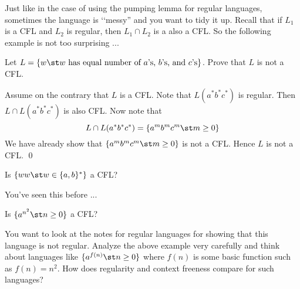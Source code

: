 \newpage
Just like in the case of using the pumping lemma for regular languages, 
sometimes the language is \lq\lq messy'' and you want to tidy it up.
Recall that if $L_1$ is a CFL and $L_2$ is regular,
then $L_1 \cap L_2$ is a also a CFL.
So the following example is not too surprising ...



\begin{eg}
Let $L = \{w \st w \text{ has equal number of $a$'s, $b$'s, and $c$'s} \}$.
Prove that $L$ is not a CFL.
\end{eg}

\SOLUTION
Assume on the contrary that $L$ is a CFL.
Note that $L(a^*b^*c^*)$ is regular.
Then $L \cap L(a^*b^*c^*)$ is also CFL.
Now note that
\[
L \cap L(a^*b^*c^*) 
= \{a^m b^m c^m \st m \geq 0 \}
\]
We have already show that $\{a^m b^m c^m \st m \geq 0 \}$
is not a CFL.
Hence $L$ is not a CFL.
\qed

\newpage
\begin{ex}
Is $\{ww \st w \in \{a, b\}^* \}$ a CFL?
\end{ex}




\newpage
You've seen this before ...

\begin{ex}
Is $\{a^{n^2} \st n \geq 0 \}$ a CFL?
\end{ex}

You want to look at the notes for regular languages for showing
that this language is not regular.
Analyze the above example very carefully and think about
languages like $\{a^{f(n)} \st n \geq 0 \}$ where $f(n)$ is some
basic function such as $f(n) = n^2$.
How does regularity and context freeness compare for such languages?



